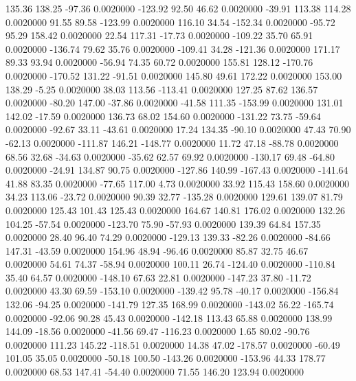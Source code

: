   135.36  138.25  -97.36   0.0020000
 -123.92   92.50   46.62   0.0020000
  -39.91  113.38  114.28   0.0020000
   91.55   89.58 -123.99   0.0020000
  116.10   34.54 -152.34   0.0020000
  -95.72   95.29  158.42   0.0020000
   22.54  117.31  -17.73   0.0020000
 -109.22   35.70   65.91   0.0020000
 -136.74   79.62   35.76   0.0020000
 -109.41   34.28 -121.36   0.0020000
  171.17   89.33   93.94   0.0020000
  -56.94   74.35   60.72   0.0020000
  155.81  128.12 -170.76   0.0020000
 -170.52  131.22  -91.51   0.0020000
  145.80   49.61  172.22   0.0020000
  153.00  138.29   -5.25   0.0020000
   38.03  113.56 -113.41   0.0020000
  127.25   87.62  136.57   0.0020000
  -80.20  147.00  -37.86   0.0020000
  -41.58  111.35 -153.99   0.0020000
  131.01  142.02  -17.59   0.0020000
  136.73   68.02  154.60   0.0020000
 -131.22   73.75  -59.64   0.0020000
  -92.67   33.11  -43.61   0.0020000
   17.24  134.35  -90.10   0.0020000
   47.43   70.90  -62.13   0.0020000
 -111.87  146.21 -148.77   0.0020000
   11.72   47.18  -88.78   0.0020000
   68.56   32.68  -34.63   0.0020000
  -35.62   62.57   69.92   0.0020000
 -130.17   69.48  -64.80   0.0020000
  -24.91  134.87   90.75   0.0020000
 -127.86  140.99 -167.43   0.0020000
 -141.64   41.88   83.35   0.0020000
  -77.65  117.00    4.73   0.0020000
   33.92  115.43  158.60   0.0020000
   34.23  113.06  -23.72   0.0020000
   90.39   32.77 -135.28   0.0020000
  129.61  139.07   81.79   0.0020000
  125.43  101.43  125.43   0.0020000
  164.67  140.81  176.02   0.0020000
  132.26  104.25  -57.54   0.0020000
 -123.70   75.90  -57.93   0.0020000
  139.39   64.84  157.35   0.0020000
   28.40   96.40   74.29   0.0020000
 -129.13  139.33  -82.26   0.0020000
  -84.66  147.31  -43.59   0.0020000
  154.96   48.94  -96.46   0.0020000
   85.87   32.75   46.67   0.0020000
   54.61   74.37  -58.94   0.0020000
  100.11   26.74 -124.40   0.0020000
 -110.84   35.40   64.57   0.0020000
 -148.10   67.63   22.81   0.0020000
 -147.23   37.80  -11.72   0.0020000
   43.30   69.59 -153.10   0.0020000
 -139.42   95.78  -40.17   0.0020000
 -156.84  132.06  -94.25   0.0020000
 -141.79  127.35  168.99   0.0020000
 -143.02   56.22 -165.74   0.0020000
  -92.06   90.28   45.43   0.0020000
 -142.18  113.43   65.88   0.0020000
  138.99  144.09  -18.56   0.0020000
  -41.56   69.47 -116.23   0.0020000
    1.65   80.02  -90.76   0.0020000
  111.23  145.22 -118.51   0.0020000
   14.38   47.02 -178.57   0.0020000
  -60.49  101.05   35.05   0.0020000
  -50.18  100.50 -143.26   0.0020000
 -153.96   44.33  178.77   0.0020000
   68.53  147.41  -54.40   0.0020000
   71.55  146.20  123.94   0.0020000

